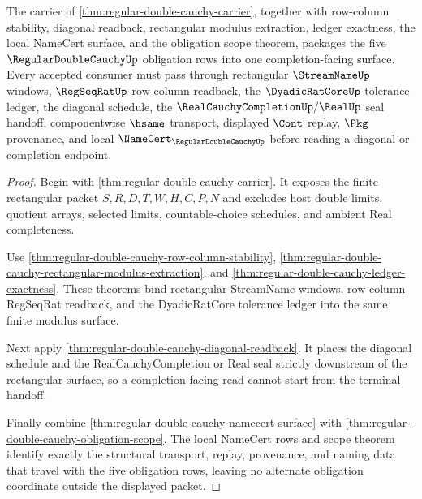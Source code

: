 \begin{theorem}
\label{thm:regular-double-cauchy-obligation-closure-package}
The carrier of \autoref{thm:regular-double-cauchy-carrier}, together with row-column stability, diagonal readback, rectangular modulus extraction, ledger exactness, the local NameCert surface, and the obligation scope theorem, packages the five $\RegularDoubleCauchyUp$ obligation rows into one completion-facing surface. Every accepted consumer must pass through rectangular $\StreamNameUp$ windows, $\RegSeqRatUp$ row-column readback, the $\DyadicRatCoreUp$ tolerance ledger, the diagonal schedule, the $\RealCauchyCompletionUp/\RealUp$ seal handoff, componentwise $\hsame$ transport, displayed $\Cont$ replay, $\Pkg$ provenance, and local $\NameCert_{\RegularDoubleCauchyUp}$ before reading a diagonal or completion endpoint.
\end{theorem}
\begin{proof}
Begin with \autoref{thm:regular-double-cauchy-carrier}. It exposes the finite rectangular packet $S,R,D,T,W,H,C,P,N$ and excludes host double limits, quotient arrays, selected limits, countable-choice schedules, and ambient Real completeness.

Use \autoref{thm:regular-double-cauchy-row-column-stability}, \autoref{thm:regular-double-cauchy-rectangular-modulus-extraction}, and \autoref{thm:regular-double-cauchy-ledger-exactness}. These theorems bind rectangular StreamName windows, row-column RegSeqRat readback, and the DyadicRatCore tolerance ledger into the same finite modulus surface.

Next apply \autoref{thm:regular-double-cauchy-diagonal-readback}. It places the diagonal schedule and the RealCauchyCompletion or Real seal strictly downstream of the rectangular surface, so a completion-facing read cannot start from the terminal handoff.

Finally combine \autoref{thm:regular-double-cauchy-namecert-surface} with \autoref{thm:regular-double-cauchy-obligation-scope}. The local NameCert rows and scope theorem identify exactly the structural transport, replay, provenance, and naming data that travel with the five obligation rows, leaving no alternate obligation coordinate outside the displayed packet.
\end{proof}


